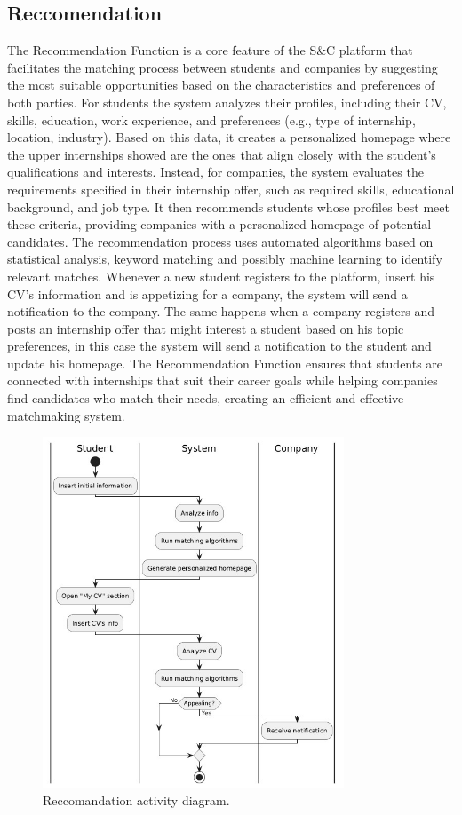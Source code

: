 \subsection{Reccomendation}
The Recommendation Function is a core feature of the S\&C platform that facilitates the matching process between students and companies by suggesting the most suitable opportunities based on the characteristics and preferences of both parties. 
For students the system analyzes their profiles, including their CV, skills, education, work experience, and preferences (e.g., type of internship, location, industry). Based on this data, it creates a personalized homepage where the upper internships showed are the ones that align closely with the student's qualifications and interests.
Instead, for companies, the system evaluates the requirements specified in their internship offer, such as required skills, educational background, and job type. It then recommends students whose profiles best meet these criteria, providing companies with a personalized homepage of potential candidates.
The recommendation process uses automated algorithms based on statistical analysis, keyword matching and possibly machine learning to identify relevant matches. Whenever a new student registers to the platform, insert his CV's information and is appetizing for a company, the system will send a notification to the company. The same happens when a company registers and posts an internship offer that might interest a student based on his topic preferences, in this case the system will send a notification to the student and update his homepage. The Recommendation Function ensures that students are connected with internships that suit their career goals while helping companies find candidates who match their needs, creating an efficient and effective matchmaking system.
\begin{figure}[H]
        \centering
        \includegraphics[width=0.8\textwidth]{RASD/Assets/ActivityDiagram/Reccomandation_AD2.png}
        \caption{Reccomandation activity diagram.}
        \label{fig:Reccomandation activity diagram.}
    \end{figure}
